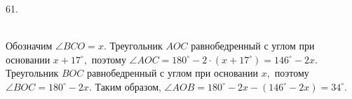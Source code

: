 61. \begin{figure}[ht!]
\end{figure}\\
Обозначим $\angle BCO=x.$ Треугольник $AOC$ равнобедренный с углом при основании $x+17^\circ,$ поэтому $\angle AOC=180^\circ-2\cdot(x+17^\circ)=146^\circ-2x.$ Треугольник $BOC$ равнобедренный с углом при основании $x,$ поэтому $\angle BOC=180^\circ-2x.$ Таким образом, $\angle AOB=180^\circ-2x-(146^\circ-2x)=34^\circ.$\\
